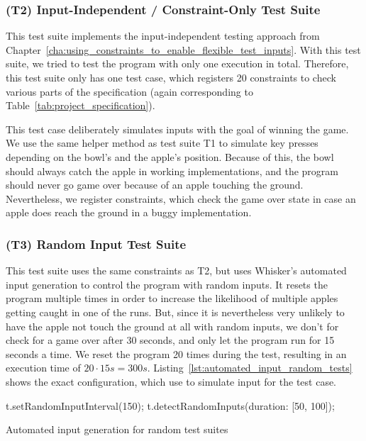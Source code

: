 \subsubsection{(T2) Input-Independent / Constraint-Only Test Suite}

This test suite implements the input-independent testing approach from Chapter~\ref{cha:using_constraints_to_enable_flexible_test_inputs}.
With this test suite, we tried to test the program with only one execution in total.
Therefore, this test suite only has one test case, which registers 20 constraints to check various parts of the specification
(again corresponding to Table~\ref{tab:project_specification}).
\parspace

This test case deliberately simulates inputs with the goal of winning the game.
We use the same helper method as test suite T1 to simulate key presses depending on the bowl's and the apple's position.
Because of this, the bowl should always catch the apple in working implementations,
and the program should never go game over because of an apple touching the ground.
Nevertheless, we register constraints, which check the game over state in case an apple does reach the ground in a buggy implementation.

\subsubsection{(T3) Random Input Test Suite}

This test suite uses the same constraints as T2, but uses Whisker's automated input generation to control the program with random inputs.
It resets the program multiple times in order to increase the likelihood of multiple apples getting caught in one of the runs.
But, since it is nevertheless very unlikely to have the apple not touch the ground at all with random inputs,
we don't for check for a game over after 30 seconds, and only let the program run for 15 seconds a time.
We reset the program 20 times during the test, resulting in an execution time of $20 \cdot 15s = 300s$.
Listing~\ref{lst:automated_input_random_tests} shows the exact configuration, which use to simulate input for the test case.
\parspace

\begin{listing}[htpb]
    \centering
    \begin{minipage}{.55\textwidth}
        \begin{javascriptcode}
            t.setRandomInputInterval(150);
            t.detectRandomInputs({duration: [50, 100]});
        \end{javascriptcode}
    \end{minipage}
    \caption{Automated input generation for random test suites}
    \label{lst:automated_input_random_tests}
\end{listing}

